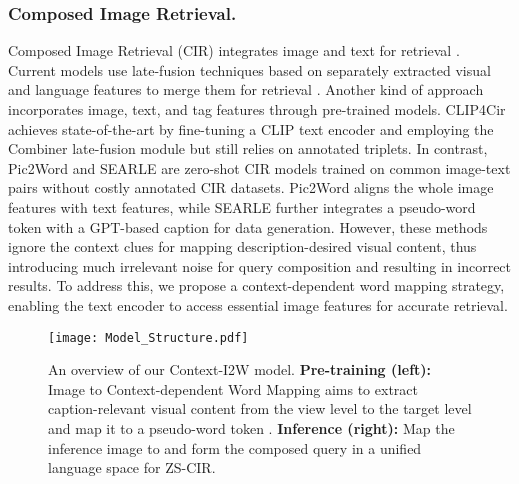 \documentclass[letterpaper]{article} \usepackage{aaai24}  \usepackage{times}  \usepackage{helvet}  \usepackage{courier}  \usepackage[hyphens]{url}  \usepackage{graphicx} \urlstyle{rm} \def\UrlFont{\rm}  \usepackage{natbib}  \usepackage{caption} \frenchspacing  \setlength{\pdfpagewidth}{8.5in} \setlength{\pdfpageheight}{11in} \usepackage{algorithm}
\begin{document}
\subsubsection{Composed Image Retrieval.} Composed Image Retrieval (CIR) integrates image and text for retrieval \cite{Vo_2019_CVPR}. Current models use late-fusion techniques based on separately extracted visual and language features to merge them for retrieval \cite{Baldrati_2022_CVPR, Liu_2021_ICCV, Chen_2020_CVPR}. Another kind of approach \cite{Goenka_2022_CVPR, 10.1007/978-3-031-19833-5_37} incorporates image, text, and tag features through pre-trained models.  CLIP4Cir \cite{Baldrati_2022_CVPR} achieves state-of-the-art by fine-tuning a CLIP \cite{radford2021learning} text encoder and employing the Combiner late-fusion module but still relies on annotated triplets. In contrast, Pic2Word \cite{Saito_2023_CVPR} and SEARLE \cite{baldrati2023zero} are zero-shot CIR models trained on common image-text pairs without costly annotated CIR datasets. Pic2Word aligns the whole image features with text features, while SEARLE further integrates a pseudo-word token with a GPT-based \cite{brown2020language} caption for data generation. However, these methods ignore the context clues for mapping description-desired visual content, thus introducing much irrelevant noise for query composition and resulting in incorrect results. To address this, we propose a context-dependent word mapping strategy, enabling the text encoder to access essential image features for accurate retrieval.


\begin{figure*}
    \centering
\texttt{[image: Model\_Structure.pdf]}   
    \caption{An overview of our Context-I2W model. \textbf{Pre-training (left):} Image to Context-dependent Word Mapping aims to extract caption-relevant visual content from the view level to the target level and map it to a pseudo-word token . \textbf{Inference (right):} Map the inference image to  and form the composed query in a unified language space for ZS-CIR.}
 \vspace{-10pt}
    \label{fig:model-architecture}
\end{figure*}
\end{document}
